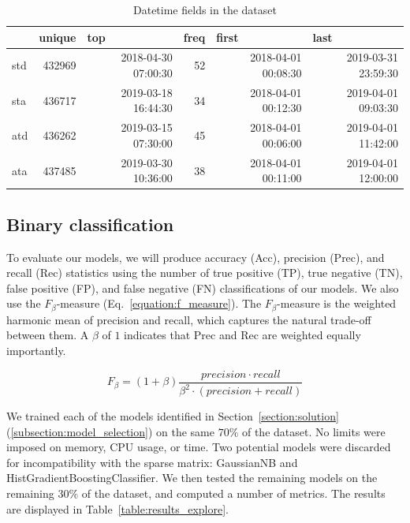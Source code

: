 \documentclass[12pt,a4paper]{article}
\begin{document}
\begin{table}[]
\centering
\caption{Datetime fields in the dataset}
\label{table:etl_datetime}
\begin{tabular}{|l|r|r|r|r|r|}
\hline
    & \multicolumn{1}{l|}{unique} & \multicolumn{1}{l|}{top} & \multicolumn{1}{l|}{freq} & \multicolumn{1}{l|}{first} & \multicolumn{1}{l|}{last} \\ \hline
std & 432969                      & 2018-04-30 07:00:30      & 52                        & 2018-04-01 00:08:30        & 2019-03-31 23:59:30       \\ \hline
sta & 436717                      & 2019-03-18 16:44:30      & 34                        & 2018-04-01 00:12:30        & 2019-04-01 09:03:30       \\ \hline
atd & 436262                      & 2019-03-15 07:30:00      & 45                        & 2018-04-01 00:06:00        & 2019-04-01 11:42:00       \\ \hline
ata & 437485                      & 2019-03-30 10:36:00      & 38                        & 2018-04-01 00:11:00        & 2019-04-01 12:00:00       \\ \hline
\end{tabular}
\end{table}


\subsection{Binary classification}

To evaluate our models, we will produce accuracy (Acc), precision (Prec), and recall (Rec) statistics using the number of true positive (TP), true negative (TN), false positive (FP), and false negative (FN) classifications of our models. We also use the $F_\beta$-measure (Eq.~\ref{equation:f_measure}). The $F_\beta$-measure is the weighted harmonic mean of precision and recall, which captures the natural trade-off between them. A $\beta$ of $1$ indicates that Prec and Rec are weighted equally importantly.

\begin{equation}
\label{equation:f_measure}
F_\beta = (1 + \beta) \frac{precision \cdot recall}{\beta^2 \cdot (precision + recall)}
\end{equation}

 We trained each of the models identified in Section~\ref{section:solution} (\ref{subsection:model_selection}) on the same $70\%$ of the dataset. No limits were imposed on memory, CPU usage, or time. Two potential models were discarded for incompatibility with the sparse matrix: GaussianNB and HistGradientBoostingClassifier. We then tested the remaining models on the remaining $30\%$ of the dataset, and computed a number of metrics. The results are displayed in Table~\ref{table:results_explore}.
\end{document}
